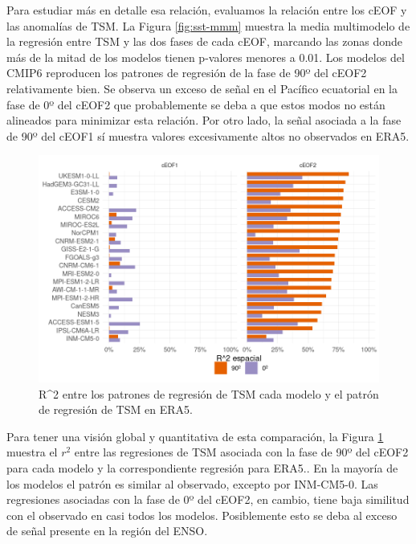 \documentclass[12pt,oneside,a4paper]{reedthesis}
\begin{document}
Para estudiar más en detalle esa relación, evaluamos la relación entre los cEOF y las anomalías de TSM.
La Figura \ref{fig:sst-mmm} muestra la media multimodelo de la regresión entre TSM y las dos fases de cada cEOF, marcando las zonas donde más de la mitad de los modelos tienen p-valores menores a 0.01.
Los modelos del CMIP6 reproducen los patrones de regresión de la fase de 90º del cEOF2 relativamente bien.
Se observa un exceso de señal en el Pacífico ecuatorial en la fase de 0º del cEOF2 que probablemente se deba a que estos modos no están alineados para minimizar esta relación.
Por otro lado, la señal asociada a la fase de 90º del cEOF1 sí muestra valores excesivamente altos no observados en ERA5.



\begin{figure}

{\centering \includegraphics{figures/50-cmip6/cor-sst-regr-1} 

}

\caption{R\^{}2 entre los patrones de regresión de TSM cada modelo y el patrón de regresión de TSM en ERA5.}\label{fig:cor-sst-regr}
\end{figure}

Para tener una visión global y quantitativa de esta comparación, la Figura \ref{fig:cor-sst-regr} muestra el \(r^2\) entre las regresiones de TSM asociada con la fase de 90º del cEOF2 para cada modelo y la correspondiente regresión para ERA5..
En la mayoría de los modelos el patrón es similar al observado, excepto por INM-CM5-0.
Las regresiones asociadas con la fase de 0º del cEOF2, en cambio, tiene baja similitud con el observado en casi todos los modelos.
Posiblemente esto se deba al exceso de señal presente en la región del ENSO.
\end{document}
